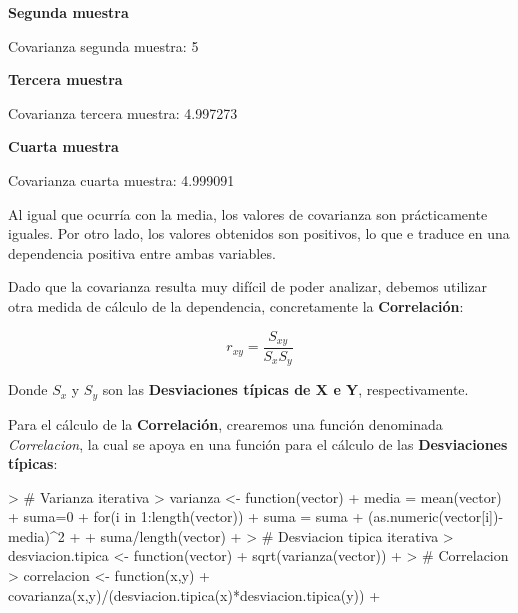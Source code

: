 \documentclass [a4paper] {article}
\begin{document}
\textbf{Segunda muestra}
\begin{Schunk}
\begin{Soutput}
Covarianza segunda muestra:  5
\end{Soutput}
\end{Schunk}

\textbf{Tercera muestra}
\begin{Schunk}
\begin{Soutput}
Covarianza tercera muestra:  4.997273
\end{Soutput}
\end{Schunk}

\textbf{Cuarta muestra}
\begin{Schunk}
\begin{Soutput}
Covarianza cuarta muestra:  4.999091
\end{Soutput}
\end{Schunk}

Al igual que ocurría con la media, los valores de covarianza son prácticamente iguales. Por otro lado,
los valores obtenidos son positivos, lo que e traduce en una dependencia positiva entre ambas variables.

Dado que la covarianza resulta muy difícil de poder analizar, debemos utilizar otra medida de cálculo de
la dependencia, concretamente la \textbf{Correlación}:

\begin{equation*}
r_{xy} = \frac{S_{xy}}{S_x S_y}
\end{equation*}

Donde $S_x$ y $S_y$ son las \textbf{Desviaciones típicas de X e Y}, respectivamente.

Para el cálculo de la \textbf{Correlación}, crearemos una función denominada \textit{Correlacion},
la cual se apoya en una función para el cálculo de las \textbf{Desviaciones típicas}:

\begin{Schunk}
\begin{Sinput}
> # Varianza iterativa
> varianza <- function(vector){
+   media = mean(vector)
+   suma=0
+   for(i in 1:length(vector)){
+     suma = suma + (as.numeric(vector[i])-media)^2
+   }
+   suma/length(vector)
+ }
> # Desviacion tipica iterativa
> desviacion.tipica <- function(vector){
+   sqrt(varianza(vector))
+ }
> # Correlacion
> correlacion <- function(x,y){
+   covarianza(x,y)/(desviacion.tipica(x)*desviacion.tipica(y))
+ }
\end{Sinput}
\end{Schunk}
\end{document}
